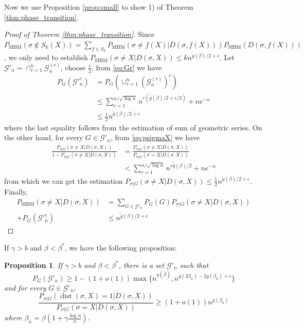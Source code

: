 \documentclass[journal]{IEEEtran}
\newtheorem{proposition}{Proposition}
\newcommand{\cG}{\mathcal{G}}
\newcommand{\1}{\mathbbm{1}}
\DeclareMathOperator{\SIBM}{SIBM}
\DeclareMathOperator{\dist}{dist}
\begin{document}
Now we use Proposition \ref{prop:small} to show 1) of Theorem \ref{thm:phase_transition}.
\begin{proof}[Proof of Theorem \ref{thm:phase_transition}]
Since $P_{\SIBM}(\sigma \not \in S_k(X)) = \sum_{f\in S_k} P_{\SIBM}(\sigma \neq f(X) | D(\sigma, f(X))) P_{\SIBM}(D(\sigma, f(X)))$,
we only need to establish $P_{\SIBM}(\sigma \neq X | D(\sigma, X)) \leq k n^{\tilde{g}(\beta)/2 + \epsilon}$.
Let $\cG'_n = \cap_{r=1}^n \cG_n^{(r)}$, choose $\frac{\epsilon}{2}$, from \eqref{eq:Gr} we have
\begin{align*}
P_G(\cG'^c_n) &= P_G(\cup_{r=1}^n (\cG_n^{(r)})^c) \\
&\leq \sum_{r=1}^{n/\sqrt{\log n } } n^{r(\tilde{g}(\beta)/2 + \epsilon/2)}  + n e^{-n} \\
& \leq \frac{1}{2} n^{\tilde{g}(\beta)/2 + \epsilon}
\end{align*}
where the last equality follows from the estimation of sum of geometric series.
On the other hand, for every $G \in \cG'_n$, from \eqref{eq:psigmaX}
we have
\begin{align*}
\frac{P_{\sigma | G}(\sigma \neq X | D(\sigma, X))}{1-P_{\sigma | G}(\sigma \neq X | D(\sigma, X))} &= \frac{P_{\sigma | G}(\sigma \neq X | D(\sigma, X))}{P_{\sigma|G}(\sigma=X | D(\sigma, X))} \\
&< \sum_{r=1}^{n/\sqrt{\log n }}  n^{r\tilde{g}(\beta)/2} + n e^{-n}
\end{align*}
from which we can get the estimation $P_{\sigma | G}(\sigma \neq X | D(\sigma, X))\leq \frac{1}{2}n^{\tilde{g}(\beta)/2 + \epsilon}$.
Finally, 
\begin{align*}
P_{\SIBM}(\sigma \neq X|D(\sigma, X)) &= \sum_{G\in \cG'_n} P_G(G)P_{\sigma |G}(\sigma \neq X | D(\sigma, X)) \\
+ P_G(\cG'^c_n)
& \leq n^{\tilde{g}(\beta)/2 + \epsilon}
\end{align*}

\end{proof}
If $\gamma > b$ and $\beta < \beta^*$, we have the following proposition:
\begin{proposition}\label{prop:large2}
	If $\gamma > b$ and $\beta < \beta^*$, there is a set $\cG'_n$ such that
	\begin{equation}
	P_G(\cG'_n) \geq 1 - (1+o(1))\max\{n^{g(\bar{\beta})}, n^{\tilde{g}(2\beta_n) - 2g(\beta_n) + \epsilon} \}
	\end{equation}
	and for every $G \in \cG'_n$,
	\begin{equation}\label{eq:diff1g}
	\frac{P_{\sigma|G}(\dist(\sigma, X)=1 | D(\sigma, X))}
	{P_{\sigma|G}(\sigma=X | D(\sigma, X))} \geq (1+o(1))n^{g(\beta_n)}
	\end{equation}
	where $\beta_n = \beta(1+\gamma\frac{\log n}{n})$.
\end{proposition}
\end{document}
